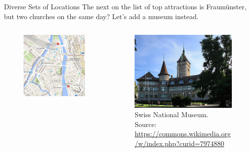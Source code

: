 \documentclass{beamer}
\begin{document}
\begin{frame}{Diverse Sets of Locations}
  The next on the list of top attractions is Fraumünster, but two churches on the same day? Let's add a museum instead.
  
  \begin{columns}
    \begin{column}{0.5\textwidth}
      \begin{figure}
        \centering
        \includegraphics[width=\textwidth]{diversity_set_2}
      \end{figure}
    \end{column}
    \begin{column}{0.5\textwidth}
      \begin{figure}
        \centering
        \includegraphics[width=.7\textwidth]{landesmuseum}
        \caption{Swiss National Museum. Source: \url{https://commons.wikimedia.org/w/index.php?curid=7974880}}
      \end{figure}
    \end{column}
  \end{columns}
\end{frame}
\end{document}
